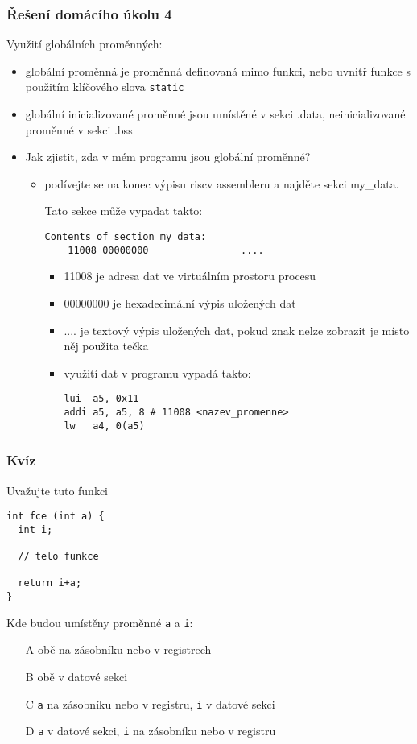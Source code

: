 \documentclass{beamer}
\begin{document}
\begin{frame}[fragile,shrink=5]
\frametitle{Řešení domácího úkolu 4}

Využití globálních proměnných:
\begin{itemize}
\item globální proměnná je proměnná definovaná mimo funkci, nebo uvnitř funkce s použitím klíčového slova \texttt{static}
\item globální inicializované proměnné jsou umístěné v sekci .data, neinicializované proměnné v sekci .bss
\item Jak zjistit, zda v mém programu jsou globální proměnné?
 \begin{itemize}
 \item podívejte se na konec výpisu riscv assembleru a najděte sekci my\_data. 
 
 Tato sekce může vypadat takto:
\begin{verbatim}
Contents of section my_data:
    11008 00000000                ....
\end{verbatim}
\begin{itemize}
 \item 11008 je adresa dat ve virtuálním prostoru procesu
 \item 00000000 je hexadecimální výpis uložených dat
 \item .... je textový výpis uložených dat, pokud znak nelze zobrazit je místo něj použita tečka
 \item využití dat v programu vypadá takto:
\begin{verbatim}
lui  a5, 0x11
addi a5, a5, 8 # 11008 <nazev_promenne>
lw   a4, 0(a5)
\end{verbatim}
 \end{itemize}
 \end{itemize}
 \end{itemize}
\end{frame}


\begin{frame}[fragile]
\frametitle{Kvíz}

Uvažujte tuto funkci
\begin{verbatim}
int fce (int a) {
  int i;
  
  // telo funkce
  
  return i+a;
}
\end{verbatim}
Kde budou umístěny proměnné \texttt{a} a \texttt{i}:
\begin{itemize}
 \item[A] obě na zásobníku nebo v registrech
 \item[B] obě v datové sekci
 \item[C] \texttt{a} na zásobníku nebo v registru, \texttt{i} v datové sekci
 \item[D] \texttt{a} v datové sekci, \texttt{i} na zásobníku nebo v registru
\end{itemize}
\end{frame}
\end{document}
